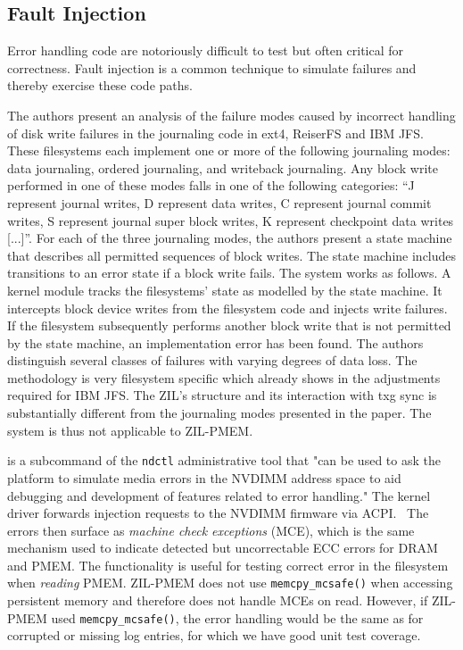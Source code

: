 \documentclass[12pt,a4paper,twoside]{book}
\begin{document}
\subsection{Fault Injection}
Error handling code are notoriously difficult to test but often critical for correctness.
Fault injection is a common technique to simulate failures and thereby exercise these code paths.

The authors present an analysis of the failure modes caused by incorrect handling of disk write failures in the journaling code in ext4, ReiserFS and IBM JFS.
These filesystems each implement one or more of the following journaling modes: data journaling, ordered journaling, and writeback journaling.
Any block write performed in one of these modes falls in one of the following categories:
“J represent journal writes, D represent data writes, C represent journal commit writes, S represent journal super block writes, K represent checkpoint data writes [...]”.
For each of the three journaling modes, the authors present a state machine that describes all permitted sequences of block writes.
The state machine includes transitions to an error state if a block write fails.
The system works as follows.
A kernel module tracks the filesystems' state as modelled by the state machine.
It intercepts block device writes from the filesystem code and injects write failures.
If the filesystem subsequently performs another block write that is not permitted by the state machine, an implementation error has been found.
The authors distinguish several classes of failures with varying degrees of data loss.
The methodology is very filesystem specific which already shows in the adjustments required for IBM JFS.
The ZIL's structure and its interaction with txg sync is substantially different from the journaling modes presented in the paper.
The system is thus not applicable to ZIL-PMEM.

 is a subcommand of the \lstinline{ndctl} administrative tool that
"can be used to ask the platform to simulate media errors in the NVDIMM address space to aid debugging and development of features related to error handling."
The kernel driver forwards injection requests to the NVDIMM firmware via ACPI.~\cite{NdctlPATCHV2}
The errors then surface as \textit{machine check exceptions} (MCE), which is the same mechanism used to indicate detected but uncorrectable ECC errors for DRAM and PMEM.
The functionality is useful for testing correct error in the filesystem when \textit{reading} PMEM.
ZIL-PMEM does not use \lstinline{memcpy_mcsafe()} when accessing persistent memory and therefore does not handle MCEs on read.
However, if ZIL-PMEM used \lstinline{memcpy_mcsafe()}, the error handling would be the same as for corrupted or missing log entries, for which we have good unit test coverage.
\end{document}
